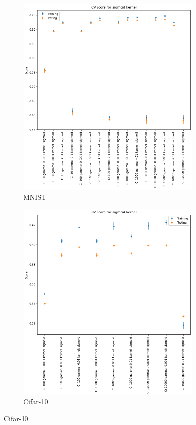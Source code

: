 \documentclass[a4paper]{article}
\begin{document}
\begin{figure}[H]
    \centering

    \begin{subfigure}[t]{0.45\linewidth}
    \includegraphics[width=\linewidth]{figures/mnist/cv_results_sigmoid.png}
    \caption{MNIST}
    \end{subfigure}
    \begin{subfigure}[t]{0.45\linewidth}
    \includegraphics[width=\linewidth]{figures/cifar/cv_results_sigmoid.png}
    \caption{Cifar-10}
    \end{subfigure}


\end{figure}
\end{document}
